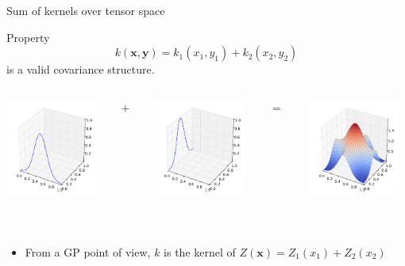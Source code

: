 \documentclass{beamer}
\begin{document}
\begin{frame}{Sum of kernels over tensor space}
\begin{block}{Property}
\begin{equation*}
k(\textbf{x},\textbf{y}) = k_1(x_1,y_1) +  k_2(x_2,y_2)
\end{equation*} is a valid covariance structure.\\
\begin{columns}[c]
\begin{column}{3cm}
\includegraphics[width=3cm]{figures/python/newfromold-sum2-k1}
\end{column}
\begin{column}{2mm}
$+$
\end{column}
\begin{column}{3cm}
\includegraphics[width=3cm]{figures/python/newfromold-sum2-k2}
\end{column}
\begin{column}{2mm}
$=$
\end{column}
\begin{column}{3cm}
\includegraphics[width=3cm]{figures/python/newfromold-sum2-k12}
\end{column}
\end{columns}
\vspace{4mm}
\end{block} \ \\
\begin{itemize}
 \item From a GP point of view, $k$ is the kernel of $Z(\textbf{x}) = Z_1(x_1) + Z_2(x_2)$
\end{itemize}
\end{frame}
\end{document}
